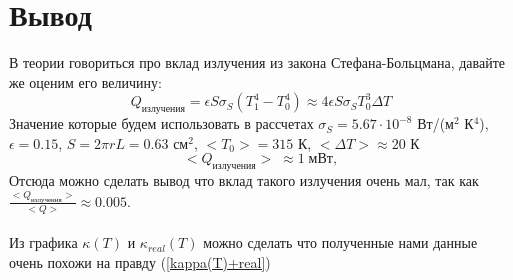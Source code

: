\documentclass[12 pt, a4paper]{article}%
\begin{document}
\section*{Вывод}
В теории говориться про вклад излучения из закона Стефана-Больцмана, давайте же оценим его величину: 
\begin{equation}
    Q_{излучения} = \epsilon S \sigma_S (T^4_1 - T^4_0) \approx 4 \epsilon S \sigma_S T^3_0 \Delta T
\end{equation}
Значение которые будем использовать в рассчетах $\sigma_S = 5.67 \cdot 10^{-8}$ Вт/(м$^2$ К$^4$), $\epsilon = 0.15$, $S = 2\pi r L = 0.63$ см$^2$, $<T_0> = 315$ К, $<\Delta T> \approx 20$ К
\begin{equation*}
    <Q_{излучения}>\; \approx 1\; мВт, 
\end{equation*}
Отсюда можно сделать вывод что вклад такого излучения очень мал, так как $\frac{<Q_{излучения}>}{<Q>} \approx 0.005$. \\ \\

Из графика $\kappa(T)$ и $\kappa_{real}(T)$ можно сделать что полученные нами данные очень похожи на правду (\ref{kappa(T)+real})
\end{document}
